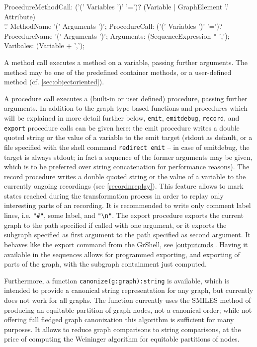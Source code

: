 \begin{rail} 
	ProcedureMethodCall: ('(' Variables ')' '=')? (Variable | GraphElement '.' Attribute) \\ '.' MethodName '(' Arguments ')';
	ProcedureCall: ('(' Variables ')' '=')? ProcedureName '(' Arguments ')';
	Arguments: (SequenceExpression * ',');
	Varibales: (Variable + ',');
\end{rail}\label{recstmt}

A method call executes a method on a variable, passing further arguments.
The method may be one of the predefined container methods, or a user-defined method (cf. \ref{sec:objectoriented}).

A procedure call executes a (built-in or user defined) procedure, passing further arguments.
In addition to the graph type based functions and procedures which will be explained in more detail further below,
\texttt{emit}, \texttt{emitdebug}, \texttt{record}, and \texttt{export} procedure calls can be given here: the emit procedure writes a double quoted string or the value of a variable to the emit target (stdout as default, or a file specified with the shell command \texttt{redirect emit} -- in case of emitdebug, the target is always stdout; in fact a sequence of the former arguments may be given, which is to be preferred over string concatenation for performance reasons).
The record procedure writes a double quoted string or the value of a variable to the currently ongoing recordings (see \ref{recordnreplay}). This feature allows to mark states reached during the transformation process in order to replay only interesting parts of an recording. It is recommended to write only comment label lines, i.e. \verb/"#"/, some label, and \verb/"\n"/.
The export procedure exports the current graph to the path specified if called with one argument, or it exports the subgraph specified as first argument to the path specified as second argument.
It behaves like the export command from the GrShell, see \ref{outputcmds}.
Having it available in the sequences allows for programmed exporting, and exporting of parts of the graph, with the subgraph containment just computed.

Furthermore, a function \texttt{canonize(g:graph):string} is available,
which is intended to provide a canonical string representation for any graph, but currently does not work for all graphs.
The function currently uses the SMILES\cite{SMILES} method of producing an equitable partition of graph nodes, not a canonical order; while not offering full fledged graph canonization this algorithm is sufficient for many purposes. 
It allows to reduce graph comparisons to string comparisons, at the price of computing the Weininger algorithm for equitable partitions of nodes.

